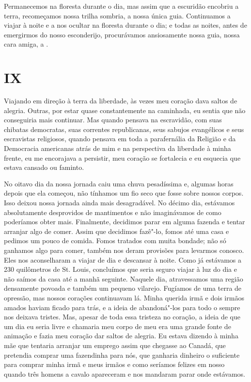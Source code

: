 Permanecemos na floresta durante o dia, mas assim que a escuridão
encobriu a terra, recomeçamos nossa trilha sombria, a 
nossa única guia. Continuamos a viajar à noite e a nos ocultar na
floresta durante o dia; e todas as noites, antes de emergirmos do nosso
esconderijo, procurávamos ansiosamente nossa guia, nossa cara amiga, a
.

\chapter{IX}

Viajando em direção à terra da liberdade, às vezes meu coração dava
saltos de alegria. Outras, por estar quase constantemente na caminhada,
eu sentia que não conseguiria mais continuar. Mas quando pensava na
escravidão, com suas chibatas democratas, suas correntes republicanas,
seus sabujos evangélicos e seus escravistas religiosos, quando pensava
em toda a parafernália da Religião e da Democracia americanas atrás de
mim e na perspectiva da liberdade à minha frente, eu me encorajava a
persistir, meu coração se fortalecia e eu esquecia que estava cansado ou
faminto.

No oitavo dia da nossa jornada caiu uma chuva pesadíssima e, algumas
horas depois que ela começou, não tínhamos um fio seco que fosse sobre
nossos corpos. Isso deixou nossa jornada ainda mais desagradável. No
décimo dia, estávamos absolutamente desprovidos de mantimentos e não
imaginávamos de como poderíamos obter mais. Finalmente, decidimos parar %
em alguma fazenda e tentar arranjar algo de comer. Assim que decidimos
fazê"-lo, fomos até uma casa e pedimos um pouco de comida. Fomos tratados
com muita bondade; não só ganhamos algo para comer, também nos deram
provisões para levarmos conosco. Eles nos aconselharam a viajar de dia e
descansar à noite. Como já estávamos a 230 quilômetros de St. Louis,
concluímos que seria seguro viajar à luz do dia e não saímos da casa até
a manhã seguinte. Naquele dia, atravessamos uma região densamente
povoada e também um pequeno vilarejo. Fugíamos de uma terra de opressão,
mas nossos corações continuavam lá. Minha querida irmã e dois irmãos
amados haviam ficado para trás, e a ideia de abandoná"-los para todo o
sempre nos deixava tristes. Mas, apesar de toda essa tristeza no
coração, a ideia de que um dia eu seria livre e chamaria meu corpo de
meu era uma grande fonte de animação e fazia meu coração dar saltos de
alegria. Eu estava dizendo à minha mãe que tentaria arranjar um emprego
assim que chegasse ao Canadá, que pretendia comprar uma fazendinha para
nós, que ganharia dinheiro o suficiente para comprar minha irmã e meus
irmãos e como seríamos felizes em nosso  quando três homens a
cavalo apareceram e nos mandaram parar onde estávamos.

